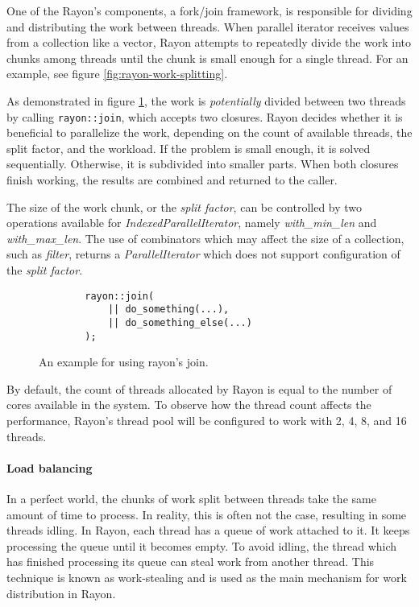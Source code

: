 One of the Rayon's components, a fork/join framework, is responsible for dividing and distributing the work between threads. When parallel iterator receives values from a collection like a vector, Rayon attempts to repeatedly divide the work into chunks among threads until the chunk is small enough for a single thread. For an example, see figure \ref{fig:rayon-work-splitting}.

As demonstrated in figure \ref{fig:rayon-join}, the work is \emph{potentially} divided between two threads by calling \texttt{rayon::join}, which accepts two closures. Rayon decides whether it is beneficial to parallelize the work, depending on the count of available threads, the split factor, and the workload. If the problem is small enough, it is solved sequentially. Otherwise, it is subdivided into smaller parts. When both closures finish working, the results are combined and returned to the caller.

The size of the work chunk, or the \emph{split factor}, can be controlled by two operations available for \emph{IndexedParallelIterator}, namely \emph{with\_min\_len} and \emph{with\_max\_len}. The use of combinators which may affect the size of a collection, such as \emph{filter}, returns a \emph{ParallelIterator} which does not support configuration of the \emph{split factor}.

\begin{figure}[!htbp]
    \centering

    \begin{verbatim}
        rayon::join(
            || do_something(...),
            || do_something_else(...)
        );
    \end{verbatim}

    \caption{An example for using rayon's join.}
    \label{fig:rayon-join}
\end{figure}

By default, the count of threads allocated by Rayon is equal to the number of cores available in the system. To observe how the thread count affects the performance, Rayon's thread pool will be configured to work with 2, 4, 8, and 16 threads.

\paragraph{Load balancing}
In a perfect world, the chunks of work split between threads take the same amount of time to process. In reality, this is often not the case, resulting in some threads idling. In Rayon, each thread has a queue of work attached to it. It keeps processing the queue until it becomes empty. To avoid idling, the thread which has finished processing its queue can steal work from another thread. This technique is known as work-stealing and is used as the main mechanism for work distribution in Rayon.


